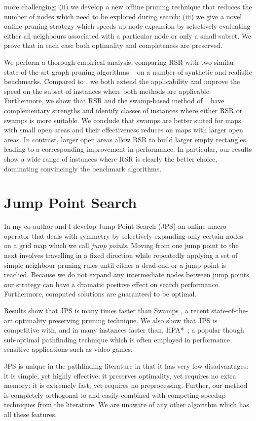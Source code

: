more challenging; (ii) we develop a new offline pruning technique that reduces
the number of nodes which need to be explored during search; (iii) we give a
novel online pruning strategy which speeds up node expansion by selectively
evaluating either all neighbours associated with a particular node or only a
small subset.  We prove that in each case both optimality and completeness are
preserved.
\par
We perform a thorough empirical analysis, comparing RSR with two similar
state-of-the-art graph pruning algorithms ~\cite{pochter10,harabor10}
on a number of synthetic and realistic benchmarks.
Compared to \cite{harabor10}, we both extend the applicability and improve the speed
on the subset of instances where both methods are applicable.
Furthermore, we show that RSR and the swamp-based method of 
\citeauthor{pochter10}~
have complementary strengths and identify classes of instances where
either RSR or swamps is more suitable.
We conclude that swamps are better suited for maps with
small open areas and their effectiveness reduces on maps with larger open areas.
In contrast, larger open areas allow RSR to build larger empty rectangles,
leading to a corresponding improvement in performance.
In particular, our results show a wide range of instances where
RSR is clearly the better choice, dominating convincingly the benchmark algorithms.

\section{Jump Point Search}
In \cite{harabor11b} my co-author and I develop Jump Point Search (JPS)
an online macro operator that
deals with symmetry by selectively expanding only certain nodes on a grid map
which we call \emph{jump points}.  Moving from one jump point to the next
involves travelling in a fixed direction while repeatedly applying a set of
simple neighbour pruning rules until either a dead-end or a jump point is
reached.  Because we do not expand any intermediate nodes between jump points
our strategy can have a dramatic positive effect on search performance.
Furthermore, computed solutions are guaranteed to be optimal.  
\par
Results show that JPS is many times faster than Swamps
\cite{pochter10}, a recent state-of-the-art optimality preserving pruning
technique.  We also show that JPS is competitive with, and in
many instances faster than, HPA*~\cite{botea04}; a popular though sub-optimal pathfinding
technique which is often employed in performance sensitive applications such as
video games.
\par
JPS is unique in the pathfinding literature in that it has very few
disadvantages: it is simple, yet highly effective; it preserves optimality, yet
requires no extra memory;  it is extremely fast, yet requires no preprocessing.
Further, our method is completely orthogonal to and easily combined with 
competing speedup techniques from the literature.
We are unaware of any other algorithm which has all these features.
